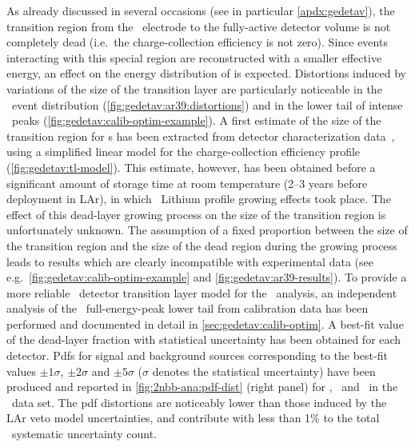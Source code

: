 \begin{description}[wide]
  \item[Transition layer model] As already discussed in several occasions (see in
    particular \cref{apdx:gedetav}), the transition region from the \nplus\ electrode to
    the fully-active detector volume is not completely dead (i.e.~the charge-collection
    efficiency is not zero). Since events interacting with this special region are
    reconstructed with a smaller effective energy, an effect on the energy distribution of
    is expected. Distortions induced by variations of the size of the transition layer are
    particularly noticeable in the \Arl\ event distribution
    (\cref{fig:gedetav:ar39:distortions}) and in the lower tail of intense \g\ peaks
    (\cref{fig:gedetav:calib-optim-example}). A first estimate of the size of the
    transition region for \bege{}s has been extracted from detector characterization
    data~\cite{Lehnert2016}, using a simplified linear model for the charge-collection
    efficiency profile (\cref{fig:gedetav:tl-model}). This estimate, however, has been
    obtained before a significant amount of storage time at room temperature (2--3 years
    before deployment in LAr), in which \nplus\ Lithium profile growing effects took
    place. The effect of this dead-layer growing process on the size of the transition
    region is unfortunately unknown. The assumption of a fixed proportion between the size
    of the transition region and the size of the dead region during the growing process
    leads to results which are clearly incompatible with experimental data (see
    e.g.~\cref{fig:gedetav:calib-optim-example} and \cref{fig:gedetav:ar39-results}).
    \newpar
    To provide a more reliable \bege\ detector transition layer model for the \nnbb\
    analysis, an independent analysis of the \Th\ full-energy-peak lower tail from
    calibration data has been performed and documented in detail in
    \cref{sec:gedetav:calib-optim}. A best-fit value of the dead-layer fraction with
    statistical uncertainty has been obtained for each detector. Pdfs for signal and
    background sources corresponding to the best-fit values $\pm1\sigma$, $\pm2\sigma$ and
    $\pm5\sigma$ ($\sigma$ denotes the statistical uncertainty) have been produced and
    reported in \cref{fig:2nbb-ana:pdf-dist} (right panel) for \kvn, \kvz\ and \nnbb\ in
    the \enrBEGeII\ data set. The pdf distortions are noticeably lower than those induced
    by the LAr veto model uncertainties, and contribute with less than 1\% to the total
    \thalftwo\ systematic uncertainty count.


\end{description}
